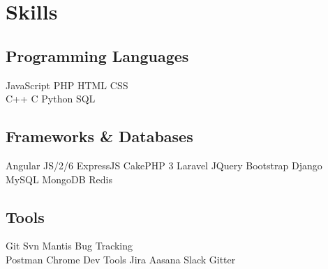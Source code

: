 \documentclass[]{deedy-resume-openfont}
\begin{document}
    
    
    
    
    
    
    
    
    \begin{minipage}[t]{0.32\textwidth} 
    
    
    \section{Skills}
    \subsection{Programming Languages}
    
    JavaScript \textbullet{}   PHP \textbullet{} HTML \textbullet{} CSS \\
    C++ \textbullet{} C \textbullet{} Python \textbullet{} SQL
    \sectionsep
    
    \subsection{Frameworks \& Databases}
    Angular JS/2/6 \space \textbullet{}ExpressJS \textbullet{} CakePHP 3 \newline \textbullet{} Laravel \textbullet{} JQuery \textbullet{} Bootstrap \textbullet{} Django \newline \textbullet{} MySQL \textbullet{} MongoDB \textbullet{} Redis 
    \sectionsep
    
    \subsection{Tools}
    Git \textbullet{} Svn \textbullet{} Mantis Bug Tracking \\ \textbullet{} Postman  \textbullet{} Chrome Dev Tools \textbullet{} Jira \newline \textbullet{} Aasana \textbullet{} Slack \textbullet{} Gitter
    \sectionsep
    

\end{minipage}
\end{document}
